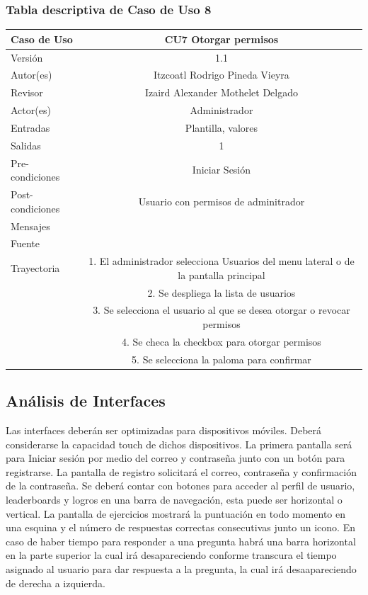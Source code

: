 \documentclass{article}
\begin{document}
\subsubsection{Tabla descriptiva de Caso de Uso 8}
\begin{tabular}{|M{5cm}|c|}
\hline
Caso de Uso & CU7 Otorgar permisos\\ \hline
Versión & 1.1\\ \hline
Autor(es) & Itzcoatl Rodrigo Pineda Vieyra \\ \hline
Revisor &  Izaird Alexander Mothelet Delgado \\ \hline
Actor(es) & Administrador \\ \hline
Entradas &  Plantilla, valores \\ \hline
Salidas & 1 \\ \hline
Pre-condiciones & Iniciar Sesión  \\ \hline
Post-condiciones & Usuario con permisos de adminitrador\\ \hline
Mensajes & \\
Fuente &  \\ \hline	
	Trayectoria
		& 1. El administrador selecciona Usuarios del menu lateral o de la pantalla principal \\
		& 2. Se despliega la lista de usuarios\\ 
		& 3. Se selecciona el usuario al que se desea otorgar o revocar permisos \\
		& 4. Se checa la checkbox para otorgar permisos\\
		& 5. Se selecciona la paloma para confirmar\\		
		\hline
\end{tabular}
\subsection{Análisis de Interfaces}
Las interfaces deberán ser optimizadas para dispositivos móviles. Deberá considerarse la capacidad touch de dichos dispositivos. La primera pantalla será para Iniciar sesión por medio del correo y contraseña junto con un botón para registrarse. La pantalla de registro solicitará el correo, contraseña y confirmación de la contraseña. Se deberá contar con botones para acceder al perfil de usuario, leaderboards y logros en una barra de navegación, esta puede ser horizontal o vertical. La pantalla de ejercicios mostrará la puntuación en todo momento en una esquina y el número de respuestas correctas consecutivas junto un icono. En caso de haber tiempo para responder a una pregunta habrá una barra horizontal en la parte superior la cual irá desapareciendo conforme transcura el tiempo asignado al usuario para dar respuesta a la pregunta, la cual irá  desaapareciendo de derecha a izquierda.
\end{document}
